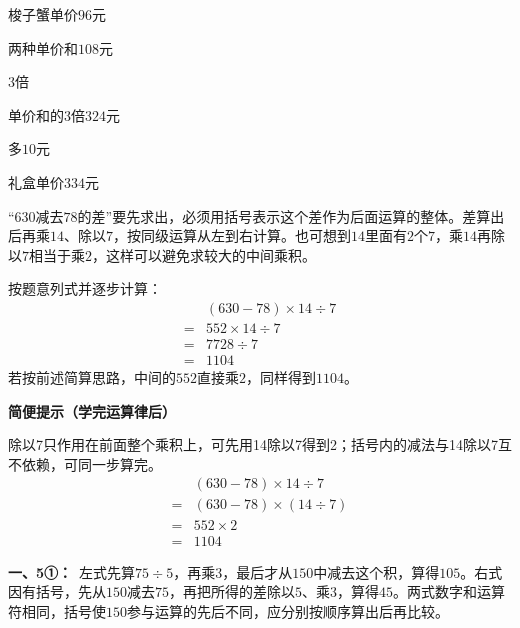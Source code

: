 \documentclass[multi=snippet,border=0pt]{standalone}
\newenvironment{snippet}[3]{\begin{minipage}{#1bp}\color{answerred}\fontsize{#2}{#3}\selectfont\raggedright}{\end{minipage}}
\begin{document}
\begin{snippet}{55.549999999999955}{7.5}{12.8}梭子蟹单价\(96\)元\end{snippet}
\begin{snippet}{93.29999999999995}{8.5}{12.8}两种单价和\(108\)元\end{snippet}
\begin{snippet}{40.799999999999955}{8.5}{12.8}\(3\)倍\end{snippet}
\begin{snippet}{117.29999999999995}{8.5}{12.8}单价和的\(3\)倍\(324\)元\end{snippet}
\begin{snippet}{40.299999999999955}{8.5}{12.8}多\(10\)元\end{snippet}
\begin{snippet}{111.79999999999995}{8.5}{12.8}礼盒单价\(334\)元\end{snippet}
\begin{snippet}{505}{11.5}{14}“\(630\)减去\(78\)的差”要先求出，必须用括号表示这个差作为后面运算的整体。差算出后再乘\(14\)、除以\(7\)，按同级运算从左到右计算。也可想到\(14\)里面有\(2\)个\(7\)，乘\(14\)再除以\(7\)相当于乘\(2\)，这样可以避免求较大的中间乘积。\par 按题意列式并逐步计算：\[\begin{aligned}&(630-78)\times14\div7\\={}&552\times14\div7\\={}&7728\div7\\={}&1104\end{aligned}\]若按前述简算思路，中间的\(552\)直接乘\(2\)，同样得到\(1104\)。\par\textbf{简便提示（学完运算律后）}\par 除以7只作用在前面整个乘积上，可先用14除以7得到2；括号内的减法与14除以7互不依赖，可同一步算完。\[\begin{aligned}&(630-78)\times14\div7\\={}&(630-78)\times(14\div7)\\={}&552\times2\\={}&1104\end{aligned}\]\end{snippet}
\begin{snippet}{505}{11.5}{14}\textbf{一、5①：}\ 左式先算\(75\div5\)，再乘\(3\)，最后才从\(150\)中减去这个积，算得\(105\)。右式因有括号，先从\(150\)减去\(75\)，再把所得的差除以\(5\)、乘\(3\)，算得\(45\)。两式数字和运算符相同，括号使\(150\)参与运算的先后不同，应分别按顺序算出后再比较。\end{snippet}
\end{document}
